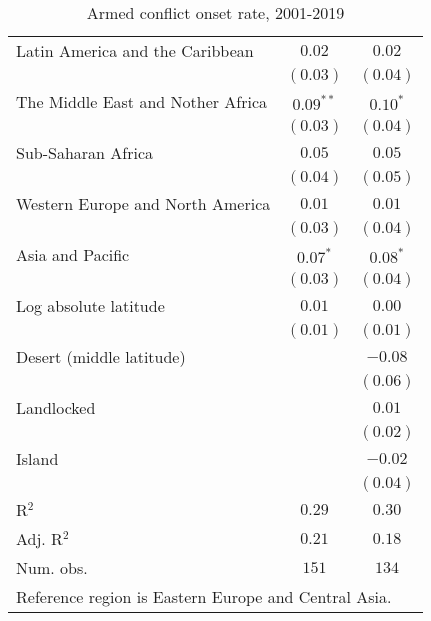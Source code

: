 \begin{table}[H]
\begin{center}
{\begin{tabular}{l c c}
Latin America and the Caribbean   & $0.02$      & $0.02$         \\
                                  & $(0.03)$    & $(0.04)$       \\
The Middle East and Nother Africa & $0.09^{**}$ & $0.10^{*}$     \\
                                  & $(0.03)$    & $(0.04)$       \\
Sub-Saharan Africa                & $0.05$      & $0.05$         \\
                                  & $(0.04)$    & $(0.05)$       \\
Western Europe and North America  & $0.01$      & $0.01$         \\
                                  & $(0.03)$    & $(0.04)$       \\
Asia and Pacific                  & $0.07^{*}$  & $0.08^{*}$     \\
                                  & $(0.03)$    & $(0.04)$       \\
Log absolute latitude             & $0.01$      & $0.00$         \\
                                  & $(0.01)$    & $(0.01)$       \\
Desert (middle latitude)          &             & $-0.08$        \\
                                  &             & $(0.06)$       \\
Landlocked                        &             & $0.01$         \\
                                  &             & $(0.02)$       \\
Island                            &             & $-0.02$        \\
                                  &             & $(0.04)$       \\
\hline
R$^2$                             & $0.29$      & $0.30$         \\
Adj. R$^2$                        & $0.21$      & $0.18$         \\
Num. obs.                         & $151$       & $134$          \\
\hline
\multicolumn{3}{l}{\scriptsize{Reference region is Eastern Europe and Central Asia.}}
\end{tabular}
}
\caption{Armed conflict onset rate, 2001-2019}
\label{onsets0119}
\end{center}
\end{table}
